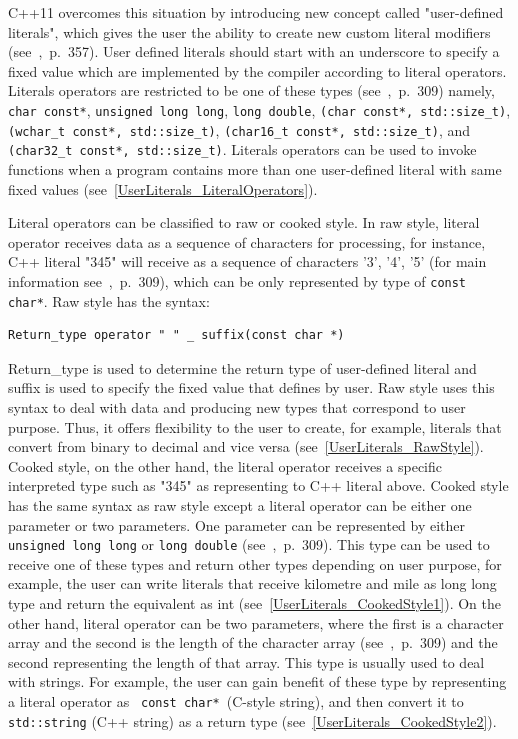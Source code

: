 \documentclass[11pt]{report}
\begin{document}
C++11 overcomes this situation by introducing new concept called "user-defined literals", which gives the user the ability to create new custom literal modifiers (see~\cite{Overland:2011:CWF},~p.~357). User defined literals should start with an underscore to specify a fixed value which are implemented by the compiler according to literal operators. Literals operators are restricted to be one of these types (see~\cite{Gregorie:professionalcpp},~p.~309) namely, \texttt{char const*}, \texttt{unsigned long long}, \texttt{long double}, \texttt{(char const*, std::size\_t)},\texttt{(wchar\_t const*, std::size\_t)}, \texttt{(char16\_t const*, std::size\_t)}, and \texttt{(char32\_t const*, std::size\_t)}. Literals operators can be used to invoke functions when a program contains more than one user-defined literal with same fixed values (see~\ref{UserLiterals_LiteralOperators}).

Literal operators can be classified to raw or cooked style. In raw style, literal operator receives data as a sequence of characters for processing, for instance, C++ literal "345" will receive as a sequence of characters '3', '4', '5' (for main information see~\cite{Gregorie:professionalcpp},~p.~309), which can be only represented by type of  \texttt{const char*}. Raw style has the syntax:
\begin{lstlisting}
Return_type operator " " _ suffix(const char *)
\end{lstlisting}
Return\_type is used to determine the return type of user-defined literal and suffix is used to specify the fixed value that defines by user. Raw style uses this syntax to deal with data and producing new types that correspond to user purpose. Thus, it offers flexibility to the user to create, for example, literals that convert from binary to decimal and vice versa (see~\ref{UserLiterals_RawStyle}). Cooked style, on the other hand, the literal operator receives a specific interpreted type such as "345" as representing to C++ literal above. Cooked style has the same syntax as raw style except a literal operator can be either one parameter or two parameters. One parameter can be represented by either \texttt{ unsigned long long} or \texttt{long double} (see~\cite{Gregorie:professionalcpp},~p.~309). This type can be used to receive one of these types and return other types depending on user purpose, for example, the user can write literals that receive kilometre and mile as long long type and return the equivalent as int (see~\ref{UserLiterals_CookedStyle1}). On the other hand, literal operator can be two parameters, where the first is a character array and the second is the length of the character array (see~\cite{Gregorie:professionalcpp},~p.~309) and the second representing the length of that array. This type is usually used to deal with strings. For example, the user can gain benefit of these type by representing a literal operator as \texttt{ const char*}~(C-style string), and then convert it to \texttt{std::string} (C++ string) as a return type (see~\ref{UserLiterals_CookedStyle2}).
\end{document}
